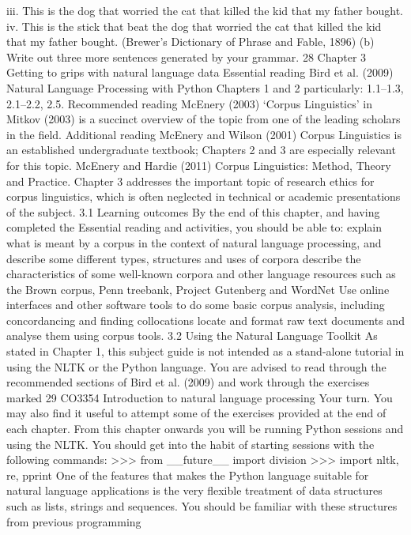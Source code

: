 iii. This is the dog that worried the cat that killed the kid that my father
bought.
iv. This is the stick that beat the dog that worried the cat that killed the kid
that my father bought.
(Brewer’s Dictionary of Phrase and Fable, 1896)
(b) Write out three more sentences generated by your grammar.
28
Chapter 3
Getting to grips with natural language data
Essential reading
Bird et al. (2009) Natural Language Processing with Python Chapters 1 and 2
particularly: 1.1–1.3, 2.1–2.2, 2.5.
Recommended reading
McEnery (2003) ‘Corpus Linguistics’ in Mitkov (2003) is a succinct overview of the
topic from one of the leading scholars in the field.
Additional reading
McEnery and Wilson (2001) Corpus Linguistics is an established undergraduate
textbook; Chapters 2 and 3 are especially relevant for this topic.
McEnery and Hardie (2011) Corpus Linguistics: Method, Theory and Practice. Chapter
3 addresses the important topic of research ethics for corpus linguistics, which is
often neglected in technical or academic presentations of the subject.
3.1 Learning outcomes
By the end of this chapter, and having completed the Essential reading and activities,
you should be able to:
explain what is meant by a corpus in the context of natural language processing,
and describe some different types, structures and uses of corpora
describe the characteristics of some well-known corpora and other language
resources such as the Brown corpus, Penn treebank, Project Gutenberg and
WordNet
Use online interfaces and other software tools to do some basic corpus analysis,
including concordancing and finding collocations
locate and format raw text documents and analyse them using corpus tools.
3.2 Using the Natural Language Toolkit
As stated in Chapter 1, this subject guide is not intended as a stand-alone tutorial in
using the NLTK or the Python language. You are advised to read through the
recommended sections of Bird et al. (2009) and work through the exercises marked
29
CO3354 Introduction to natural language processing
Your turn. You may also find it useful to attempt some of the exercises provided at
the end of each chapter.
From this chapter onwards you will be running Python sessions and using the NLTK.
You should get into the habit of starting sessions with the following commands:
>>> from __future__ import division
>>> import nltk, re, pprint
One of the features that makes the Python language suitable for natural language
applications is the very flexible treatment of data structures such as lists, strings and
sequences. You should be familiar with these structures from previous programming
